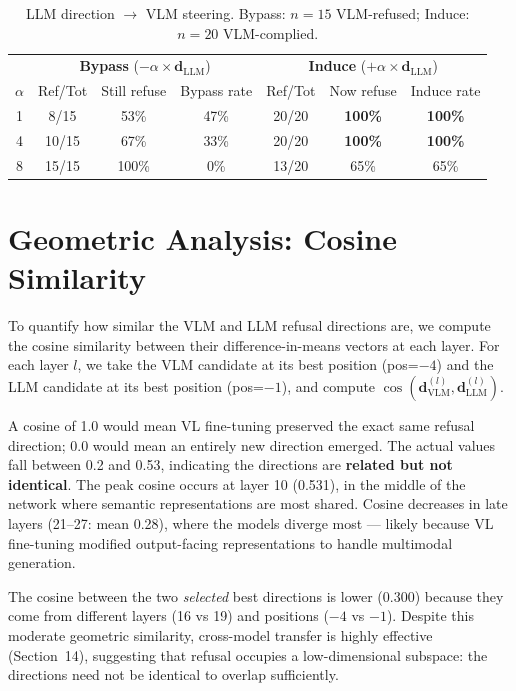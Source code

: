 \documentclass[11pt,a4paper]{article}
\begin{document}
\begin{table}[H]\centering
\caption{LLM direction $\to$ VLM steering. Bypass: $n=15$ VLM-refused; Induce: $n=20$ VLM-complied.}
\begin{tabular}{c|ccc|ccc}
\toprule
& \multicolumn{3}{c|}{\textbf{Bypass} ($-\alpha \times \mathbf{d}_\text{LLM}$)} & \multicolumn{3}{c}{\textbf{Induce} ($+\alpha \times \mathbf{d}_\text{LLM}$)} \\
$\alpha$ & Ref/Tot & Still refuse & Bypass rate & Ref/Tot & Now refuse & Induce rate \\
\midrule
1 &  8/15 & 53\% & 47\%          & 20/20 & \textbf{100\%} & \textbf{100\%} \\
4 & 10/15 & 67\% & 33\%          & 20/20 & \textbf{100\%} & \textbf{100\%} \\
8 & 15/15 & 100\% & 0\%          & 13/20 & 65\%           & 65\% \\
\bottomrule
\end{tabular}
\end{table}

\section{Geometric Analysis: Cosine Similarity}

To quantify how similar the VLM and LLM refusal directions are, we compute the cosine similarity between their difference-in-means vectors at each layer. For each layer $l$, we take the VLM candidate at its best position (pos=$-4$) and the LLM candidate at its best position (pos=$-1$), and compute $\cos(\mathbf{d}_\text{VLM}^{(l)}, \mathbf{d}_\text{LLM}^{(l)})$.

A cosine of 1.0 would mean VL fine-tuning preserved the exact same refusal direction; 0.0 would mean an entirely new direction emerged. The actual values fall between 0.2 and 0.53, indicating the directions are \textbf{related but not identical}. The peak cosine occurs at layer 10 (0.531), in the middle of the network where semantic representations are most shared. Cosine decreases in late layers (21--27: mean 0.28), where the models diverge most --- likely because VL fine-tuning modified output-facing representations to handle multimodal generation.

The cosine between the two \emph{selected} best directions is lower (0.300) because they come from different layers (16 vs 19) and positions ($-4$ vs $-1$). Despite this moderate geometric similarity, cross-model transfer is highly effective (Section~14), suggesting that refusal occupies a low-dimensional subspace: the directions need not be identical to overlap sufficiently.
\end{document}
